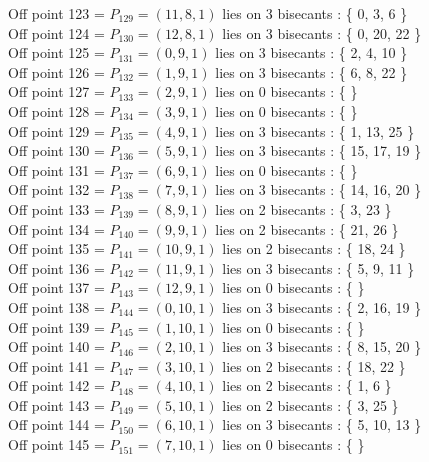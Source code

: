 \documentclass{article}
\begin{document}
{Off point 123 = $P_{129} = ( 11, 8, 1 )$ lies on 3 bisecants : \{ 0, 3, 6 \}\\
Off point 124 = $P_{130} = ( 12, 8, 1 )$ lies on 3 bisecants : \{ 0, 20, 22 \}\\
Off point 125 = $P_{131} = ( 0, 9, 1 )$ lies on 3 bisecants : \{ 2, 4, 10 \}\\
Off point 126 = $P_{132} = ( 1, 9, 1 )$ lies on 3 bisecants : \{ 6, 8, 22 \}\\
Off point 127 = $P_{133} = ( 2, 9, 1 )$ lies on 0 bisecants : \{  \}\\
Off point 128 = $P_{134} = ( 3, 9, 1 )$ lies on 0 bisecants : \{  \}\\
Off point 129 = $P_{135} = ( 4, 9, 1 )$ lies on 3 bisecants : \{ 1, 13, 25 \}\\
Off point 130 = $P_{136} = ( 5, 9, 1 )$ lies on 3 bisecants : \{ 15, 17, 19 \}\\
Off point 131 = $P_{137} = ( 6, 9, 1 )$ lies on 0 bisecants : \{  \}\\
Off point 132 = $P_{138} = ( 7, 9, 1 )$ lies on 3 bisecants : \{ 14, 16, 20 \}\\
Off point 133 = $P_{139} = ( 8, 9, 1 )$ lies on 2 bisecants : \{ 3, 23 \}\\
Off point 134 = $P_{140} = ( 9, 9, 1 )$ lies on 2 bisecants : \{ 21, 26 \}\\
Off point 135 = $P_{141} = ( 10, 9, 1 )$ lies on 2 bisecants : \{ 18, 24 \}\\
Off point 136 = $P_{142} = ( 11, 9, 1 )$ lies on 3 bisecants : \{ 5, 9, 11 \}\\
Off point 137 = $P_{143} = ( 12, 9, 1 )$ lies on 0 bisecants : \{  \}\\
Off point 138 = $P_{144} = ( 0, 10, 1 )$ lies on 3 bisecants : \{ 2, 16, 19 \}\\
Off point 139 = $P_{145} = ( 1, 10, 1 )$ lies on 0 bisecants : \{  \}\\
Off point 140 = $P_{146} = ( 2, 10, 1 )$ lies on 3 bisecants : \{ 8, 15, 20 \}\\
Off point 141 = $P_{147} = ( 3, 10, 1 )$ lies on 2 bisecants : \{ 18, 22 \}\\
Off point 142 = $P_{148} = ( 4, 10, 1 )$ lies on 2 bisecants : \{ 1, 6 \}\\
Off point 143 = $P_{149} = ( 5, 10, 1 )$ lies on 2 bisecants : \{ 3, 25 \}\\
Off point 144 = $P_{150} = ( 6, 10, 1 )$ lies on 3 bisecants : \{ 5, 10, 13 \}\\
Off point 145 = $P_{151} = ( 7, 10, 1 )$ lies on 0 bisecants : \{  \}\\
}
\end{document}
